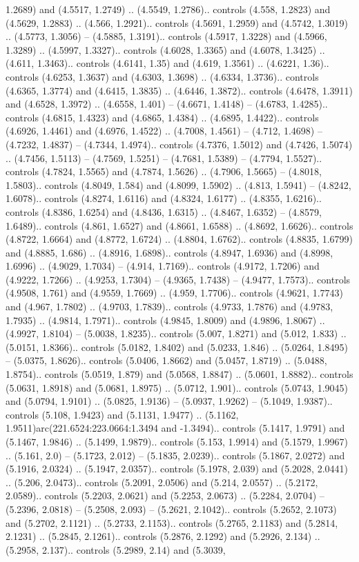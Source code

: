1.2689) and (4.5517, 1.2749) .. (4.5549, 1.2786).. controls (4.558, 1.2823) and (4.5629, 1.2883) .. (4.566, 1.2921).. controls (4.5691, 1.2959) and (4.5742, 1.3019) .. (4.5773, 1.3056) -- (4.5885, 1.3191).. controls (4.5917, 1.3228) and (4.5966, 1.3289) .. (4.5997, 1.3327).. controls (4.6028, 1.3365) and (4.6078, 1.3425) .. (4.611, 1.3463).. controls (4.6141, 1.35) and (4.619, 1.3561) .. (4.6221, 1.36).. controls (4.6253, 1.3637) and (4.6303, 1.3698) .. (4.6334, 1.3736).. controls (4.6365, 1.3774) and (4.6415, 1.3835) .. (4.6446, 1.3872).. controls (4.6478, 1.3911) and (4.6528, 1.3972) .. (4.6558, 1.401) -- (4.6671, 1.4148) -- (4.6783, 1.4285).. controls (4.6815, 1.4323) and (4.6865, 1.4384) .. (4.6895, 1.4422).. controls (4.6926, 1.4461) and (4.6976, 1.4522) .. (4.7008, 1.4561) -- (4.712, 1.4698) -- (4.7232, 1.4837) -- (4.7344, 1.4974).. controls (4.7376, 1.5012) and (4.7426, 1.5074) .. (4.7456, 1.5113) -- (4.7569, 1.5251) -- (4.7681, 1.5389) -- (4.7794, 1.5527).. controls (4.7824, 1.5565) and (4.7874, 1.5626) .. (4.7906, 1.5665) -- (4.8018, 1.5803).. controls (4.8049, 1.584) and (4.8099, 1.5902) .. (4.813, 1.5941) -- (4.8242, 1.6078).. controls (4.8274, 1.6116) and (4.8324, 1.6177) .. (4.8355, 1.6216).. controls (4.8386, 1.6254) and (4.8436, 1.6315) .. (4.8467, 1.6352) -- (4.8579, 1.6489).. controls (4.861, 1.6527) and (4.8661, 1.6588) .. (4.8692, 1.6626).. controls (4.8722, 1.6664) and (4.8772, 1.6724) .. (4.8804, 1.6762).. controls (4.8835, 1.6799) and (4.8885, 1.686) .. (4.8916, 1.6898).. controls (4.8947, 1.6936) and (4.8998, 1.6996) .. (4.9029, 1.7034) -- (4.914, 1.7169).. controls (4.9172, 1.7206) and (4.9222, 1.7266) .. (4.9253, 1.7304) -- (4.9365, 1.7438) -- (4.9477, 1.7573).. controls (4.9508, 1.761) and (4.9559, 1.7669) .. (4.959, 1.7706).. controls (4.9621, 1.7743) and (4.967, 1.7802) .. (4.9703, 1.7839).. controls (4.9733, 1.7876) and (4.9783, 1.7935) .. (4.9814, 1.7971).. controls (4.9845, 1.8009) and (4.9896, 1.8067) .. (4.9927, 1.8104) -- (5.0038, 1.8235).. controls (5.007, 1.8271) and (5.012, 1.833) .. (5.0151, 1.8366).. controls (5.0182, 1.8402) and (5.0233, 1.846) .. (5.0264, 1.8495) -- (5.0375, 1.8626).. controls (5.0406, 1.8662) and (5.0457, 1.8719) .. (5.0488, 1.8754).. controls (5.0519, 1.879) and (5.0568, 1.8847) .. (5.0601, 1.8882).. controls (5.0631, 1.8918) and (5.0681, 1.8975) .. (5.0712, 1.901).. controls (5.0743, 1.9045) and (5.0794, 1.9101) .. (5.0825, 1.9136) -- (5.0937, 1.9262) -- (5.1049, 1.9387).. controls (5.108, 1.9423) and (5.1131, 1.9477) .. (5.1162, 1.9511)arc(221.6524:223.0664:1.3494 and -1.3494).. controls (5.1417, 1.9791) and (5.1467, 1.9846) .. (5.1499, 1.9879).. controls (5.153, 1.9914) and (5.1579, 1.9967) .. (5.161, 2.0) -- (5.1723, 2.012) -- (5.1835, 2.0239).. controls (5.1867, 2.0272) and (5.1916, 2.0324) .. (5.1947, 2.0357).. controls (5.1978, 2.039) and (5.2028, 2.0441) .. (5.206, 2.0473).. controls (5.2091, 2.0506) and (5.214, 2.0557) .. (5.2172, 2.0589).. controls (5.2203, 2.0621) and (5.2253, 2.0673) .. (5.2284, 2.0704) -- (5.2396, 2.0818) -- (5.2508, 2.093) -- (5.2621, 2.1042).. controls (5.2652, 2.1073) and (5.2702, 2.1121) .. (5.2733, 2.1153).. controls (5.2765, 2.1183) and (5.2814, 2.1231) .. (5.2845, 2.1261).. controls (5.2876, 2.1292) and (5.2926, 2.134) .. (5.2958, 2.137).. controls (5.2989, 2.14) and (5.3039, 